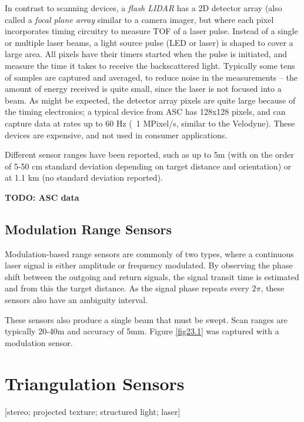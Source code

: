 \documentclass[twocolumn,oneside]{book}
\begin{document}
In contrast to scanning devices, a {\em flash LIDAR} has a 2D detector
array (also called a {\em focal plane array} similar to a camera
imager, but where each pixel incorporates timing circuitry to measure
TOF of a laser pulse.  Instead of a single or multiple laser beams, a
light source pulse (LED or laser) is shaped to cover a large area.
All pixels have their timers started when the pulse is initiated, and
measure the time it takes to receive the backscattered light.
Typically some tens of samples are captured and averaged, to reduce
noise in the measurements -- the amount of energy received is quite
small, since the laser is not focused into a beam.  As might be
expected, the detector array pixels are quite large because of the
timing electronics; a typical device from ASC \cite{} has 128x128
pixels, and can capture data at rates up to 60 Hz (~1 MPixel/s,
similar to the Velodyne).  These devices are expensive, and not used
in consumer applications.

Different sensor ranges have been reported, such as up to 5m
\cite{anderson} (with on the order of 5-50 cm standard deviation
depending on target distance and orientation) or at 1.1 km
\cite{stettner} (no standard deviation reported).  

{\bf TODO: ASC data}

\subsection{Modulation Range Sensors}

Modulation-based range sensors are commonly of two types, where a
continuous laser signal is either amplitude or frequency modulated.
By observing the phase shift between the outgoing and return signals,
the signal transit time is estimated and from this the target
distance.  As the signal phase repeats every $2 \pi$, these sensors
also have an ambiguity interval.

These sensors also produce a single beam that must be swept.
Scan ranges are typically 20-40m and accuracy of 5mm.
Figure \ref{fig23.1} was captured with a modulation sensor.




 
\section{Triangulation Sensors}

[stereo; projected texture; structured light; laser]
\end{document}
